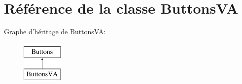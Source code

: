 \hypertarget{classButtonsVA}{\section{Référence de la classe Buttons\+V\+A}
\label{classButtonsVA}
}
Graphe d'héritage de Buttons\+V\+A\+:\begin{figure}[H]
\begin{center}
\leavevmode
\includegraphics[height=2.000000cm]{classButtonsVA}
\end{center}
\end{figure}
